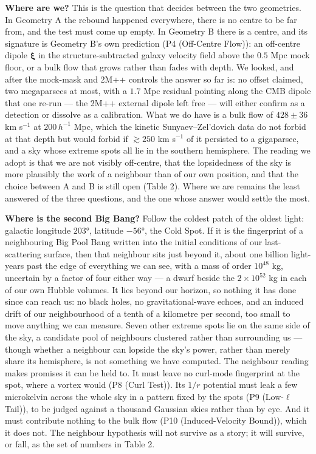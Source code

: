 \documentclass[
]{article}
\begin{document}
\textbf{Where are we?} This is the question that decides between the two
geometries. In Geometry A the rebound happened everywhere, there is no
centre to be far from, and the test must come up empty. In Geometry B
there is a centre, and its signature is Geometry B's own prediction (P4
(Off-Centre Flow)): an off-centre dipole \(\boldsymbol{\xi}\) in the
structure-subtracted galaxy velocity field above the \(0.5\) Mpc mock
floor, or a bulk flow that grows rather than fades with depth. We
looked, and after the mock-mask and 2M++ controls the answer so far is:
no offset claimed, two megaparsecs at most, with a \(1.7\) Mpc residual
pointing along the CMB dipole that one re-run --- the 2M++ external
dipole left free --- will either confirm as a detection or dissolve as a
calibration. What we do have is a bulk flow of \(428 \pm 36\) km
s\(^{-1}\) at \(200\,h^{-1}\) Mpc, which the kinetic Sunyaev--Zel'dovich
data do not forbid at that depth but would forbid if \(\gtrsim 250\) km
s\(^{-1}\) of it persisted to a gigaparsec, and a sky whose extreme
spots all lie in the southern hemisphere. The reading we adopt is that
we are not visibly off-centre, that the lopsidedness of the sky is more
plausibly the work of a neighbour than of our own position, and that the
choice between A and B is still open (Table 2). Where we are remains the
least answered of the three questions, and the one whose answer would
settle the most.

\textbf{Where is the second Big Bang?} Follow the coldest patch of the
oldest light: galactic longitude \(203°\), latitude \(-56°\), the Cold
Spot. If it is the fingerprint of a neighbouring Big Pool Bang written
into the initial conditions of our last-scattering surface, then that
neighbour sits just beyond it, about one billion light-years past the
edge of everything we can see, with a mass of order \(10^{48}\) kg,
uncertain by a factor of four either way --- a dwarf beside the
\(2\times10^{52}\) kg in each of our own Hubble volumes. It lies beyond
our horizon, so nothing it has done since can reach us: no black holes,
no gravitational-wave echoes, and an induced drift of our neighbourhood
of a tenth of a kilometre per second, too small to move anything we can
measure. Seven other extreme spots lie on the same side of the sky, a
candidate pool of neighbours clustered rather than surrounding us ---
though whether a neighbour can lopside the sky's power, rather than
merely share its hemisphere, is not something we have computed. The
neighbour reading makes promises it can be held to. It must leave no
curl-mode fingerprint at the spot, where a vortex would (P8 (Curl
Test)). Its \(1/r\) potential must leak a few microkelvin across the
whole sky in a pattern fixed by the spots (P9 (Low-\(\ell\) Tail)), to
be judged against a thousand Gaussian skies rather than by eye. And it
must contribute nothing to the bulk flow (P10 (Induced-Velocity Bound)),
which it does not. The neighbour hypothesis will not survive as a story;
it will survive, or fall, as the set of numbers in Table 2.
\end{document}
